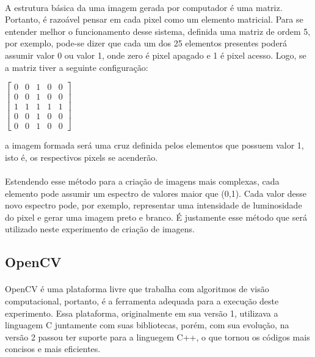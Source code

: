 \documentclass{article}
\begin{document}
	\paragraph{}
	A estrutura básica da uma imagem gerada por computador é uma matriz. Portanto, é razoável pensar em cada pixel como um elemento matricial. Para se entender melhor o funcionamento desse sistema, definida uma matriz de ordem 5, por exemplo, pode-se dizer que cada um dos 25 elementos presentes poderá assumir valor 0 ou valor 1, onde zero é pixel apagado e 1 é pixel acesso. Logo, se a matriz tiver a seguinte configuração: \newline

	\begin{center}
	$
		\left[
		\begin{matrix}
		0 & 0 & 1 & 0 & 0\\
		0 & 0 & 1 & 0 & 0\\
		1 & 1 & 1 & 1 & 1\\
		0 & 0 & 1 & 0 & 0\\
		0 & 0 & 1 & 0 & 0
		\end{matrix}
		\right]
	$
	\end{center}

	a imagem formada será uma cruz definida pelos elementos que possuem valor 1, isto é, os respectivos pixels se acenderão.

	\paragraph{}
	Estendendo esse método para a criação de imagens mais complexas, cada elemento pode assumir um espectro de valores maior que (0,1). Cada valor desse novo espectro pode, por exemplo, representar uma intensidade de luminosidade do pixel e gerar uma imagem preto e branco. É justamente esse método que será utilizado neste experimento de criação de imagens.

	\subsection{OpenCV}
	\paragraph{}
	OpenCV é uma plataforma livre que trabalha com algoritmos de visão computacional, portanto, é a ferramenta adequada para a execução deste experimento. Essa plataforma, originalmente em sua versão 1, utilizava a linguagem C juntamente com suas bibliotecas, porém, com sua evolução, na versão 2 passou ter suporte para a linguegem C++, o que tornou os códigos mais concisos e mais eficientes.
\end{document}
